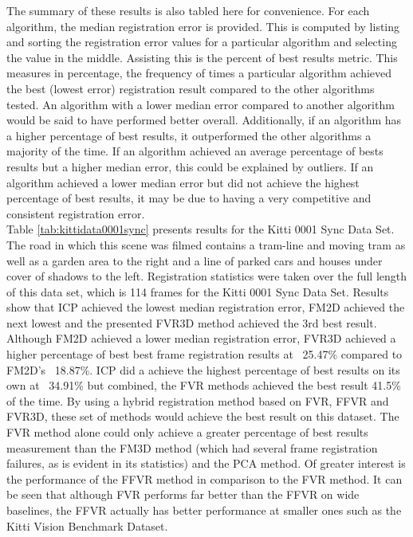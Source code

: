 The summary of these results is also tabled here for convenience. For each algorithm, the median registration error is provided. This is computed by listing and sorting the registration error values for a particular algorithm and selecting the value in the middle. Assisting this is the percent of best results metric. This measures in percentage, the frequency of times a particular algorithm achieved the best (lowest error) registration result compared to the other algorithms tested. An algorithm with a lower median error compared to another algorithm would be said to have performed better overall. Additionally, if an algorithm has a higher percentage of best results, it outperformed the other algorithms a majority of the time. If an algorithm achieved an average percentage of bests results but a higher median error, this could be explained by outliers. If an algorithm achieved a lower median error but did not achieve the highest percentage of best results, it may be due to having a very competitive and consistent registration error. \\

Table \ref{tab:kittidata0001sync} presents results for the Kitti 0001 Sync Data Set. The road in which this scene was filmed contains a tram-line and moving tram as well as a garden area to the right and a line of parked cars and houses under cover of shadows to the left. Registration statistics were taken over the full length of this data set, which is 114 frames for the Kitti 0001 Sync Data Set. Results show that ICP achieved the lowest median registration error, FM2D achieved the next lowest and the presented FVR3D method achieved the 3rd best result. Although FM2D achieved a lower median registration error, FVR3D achieved a higher percentage of best best frame registration results at ~25.47\% compared to FM2D's ~18.87\%. ICP did a achieve the highest percentage of best results on its own at ~34.91\% but combined, the FVR methods achieved the best result 41.5\% of the time. By using a hybrid registration method based on FVR, FFVR and FVR3D, these set of methods would achieve the best result on this dataset. The FVR method alone could only achieve a greater percentage of best results measurement than the FM3D method (which had several frame registration failures, as is evident in its statistics) and the PCA method. Of greater interest is the performance of the FFVR method in comparison to the FVR method. It can be seen that although FVR performs far better than the FFVR on wide baselines, the FFVR actually has better performance at smaller ones such as the Kitti Vision Benchmark Dataset. \\ 


